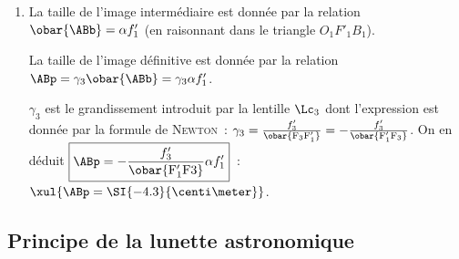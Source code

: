 \documentclass[a4paper, 10pt, garamond, oneside]{book}
\begin{document}
{\begin{enumerate}
		      $\obar{\rm F_3A_1}.\obar{\rm F'_3A'} = - f'^2_3$ soit $\obar{\rm
				      F_3F'_1}.\obar{\rm F'_3P} = - f'^2_3$ d'où $\obar{\rm F'_1F_3} =
			      \frac{f'^2_3}{\obar{\rm F'_3P}} = \frac{f'^2_3}{\obar{\rm F'_3O_3} +
				      \obar{\rm O_3P}}$

		      On aboutit à $\boxed{\obar{\rm F'_1F_3} = \frac{f'^2_3}{\obar{\rm
						      O_3P} - f'_3}}$~: $\xul{\obar{\rm F'_1F_3} =
				      \SI{0.69}{\centi\meter}}$

		\item La taille de l'image intermédiaire est donnée par la relation
		      $\obar{\rm \ABb} = \alpha f'_1$ (en raisonnant dans le triangle
		      $O_1F'_1B_1$).

		      La taille de l'image définitive est donnée par la relation $\ABp =
			      \gamma_3 \obar{\rm \ABb} = \gamma_3 \alpha f'_1$.

		      $\gamma_3$ est le grandissement introduit par la lentille $\Lc_3$ dont
		      l'expression est donnée par la formule de \textsc{Newton}~: $\gamma_3 =
			      \frac{f'_3}{\obar{\rm F_3F'_1}} = - \frac{f'_3}{\obar{\rm F'_1F_3}}$.
		      On en déduit $\boxed{\ABp = - \frac{f'_3}{\obar{\rm F'_1F3}} \alpha
				      f'_1}$~: $\xul{\ABp = \SI{-4.3}{\centi\meter}}$.
	\end{enumerate}
}

\subsection{Principe de la lunette astronomique}
\end{document}
